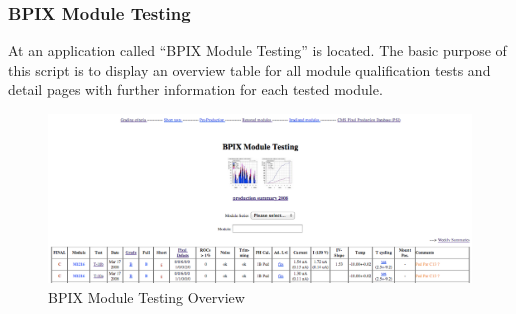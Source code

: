 \documentclass[0_Bericht]{subfiles}
\begin{document}
			\subsubsection{BPIX Module Testing}
				At  an application called ``BPIX Module Testing'' is located. The basic purpose of this script is to display an overview table for all module qualification tests and detail pages with further information for each tested module.
				\begin{figure}[h!]
					\centering
					\includegraphics[width=160mm]{Content/Graphics/4_1_BPIXModuleTesting.png}
					\caption{BPIX Module Testing Overview}
					\label{fig:AnalysisOfExistingApplicationBPIXModuleTestingOverview}
				\end{figure}
\end{document}
